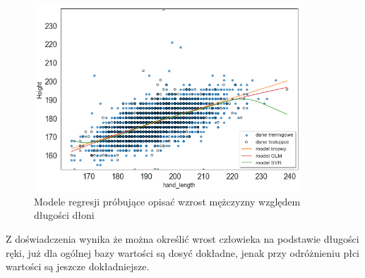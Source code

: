 \documentclass{article}
\begin{document}
\begin{figure}[H]
    \centering
    \includegraphics[width=10cm]{modelregresjiwysokosc_men.png}
    \caption{Modele regresji próbujące opisać wzrost mężczyzny względem długości dłoni}
    \label{fig:my_img}
\end{figure}
Z doświadczenia wynika że można określić wrost człowieka na podstawie długości ręki, już dla ogólnej bazy wartości są dosyć dokładne, jenak przy odróżnieniu płci wartości są jeszcze dokładniejsze.






\newpage
\end{document}
